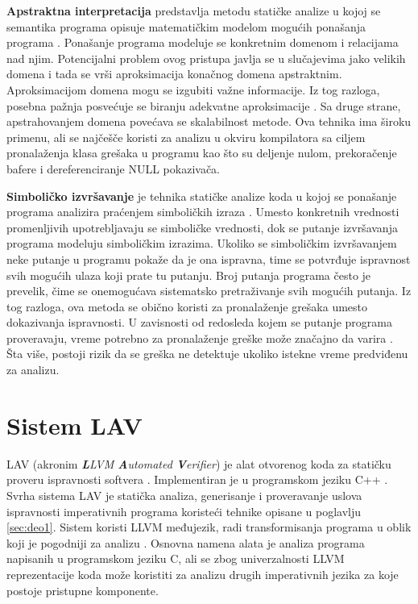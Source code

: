 \documentclass[12pt,oneside]{memoir}
\begin{document}
\par
\textbf{Apstraktna interpretacija} predstavlja metodu statičke analize u kojoj se semantika programa opisuje matematičkim modelom mogućih ponašanja programa \cite{AbstractInterpretation}. Ponašanje programa modeluje se konkretnim domenom i relacijama nad njim. Potencijalni problem ovog pristupa javlja se u slučajevima jako velikih domena i tada se vrši aproksimacija konačnog domena apstraktnim. Aproksimacijom domena mogu se izgubiti važne informacije. Iz tog razloga, posebna pažnja posvećuje se biranju adekvatne aproksimacije \cite{AbstractInterpretation2}. Sa druge strane, apstrahovanjem domena povećava se skalabilnost metode. Ova tehnika ima široku primenu, ali se najčešče koristi za analizu u okviru kompilatora sa ciljem pronalaženja klasa grešaka u programu kao što su deljenje nulom, prekoračenje bafere i dereferenciranje NULL pokazivača.
\par
\textbf{Simboličko izvršavanje} je tehnika statičke analize koda u kojoj se ponašanje programa analizira praćenjem simboličkih izraza \cite{SymbolicExecution}. Umesto konkretnih vrednosti promenljivih upotrebljavaju se simboličke vrednosti, dok se putanje izvršavanja programa modeluju simboličkim izrazima. Ukoliko se simboličkim izvršavanjem neke putanje u programu pokaže da je ona ispravna, time se potvrđuje ispravnost svih mogućih ulaza koji prate tu putanju. Broj putanja programa često je prevelik, čime se onemogućava sistematsko pretraživanje svih mogućih putanja. Iz tog razloga, ova metoda se obično koristi za pronalaženje grešaka umesto dokazivanja ispravnosti. U zavisnosti od redosleda kojem se putanje programa proveravaju, vreme potrebno za pronalaženje greške može značajno da varira \cite{vstteLAV12}. Šta više, postoji rizik da se greška ne detektuje ukoliko istekne vreme predviđenu za analizu.
\section{Sistem LAV}  \label{sec:deo2}
LAV (akronim \textit{\textbf{L}LVM \textbf{A}utomated \textbf{V}erifier}) je alat otvorenog koda za statičku proveru ispravnosti softvera \cite{LAVTool}. Implementiran je u programskom jeziku C++ \cite{LAVCode}. Svrha sistema LAV je statička analiza, generisanje i proveravanje uslova ispravnosti imperativnih programa koristeći tehnike opisane u poglavlju \ref{sec:deo1}. Sistem koristi LLVM međujezik, radi transformisanja programa u oblik koji je pogodniji za analizu \cite{LLVMTool}. Osnovna namena alata je analiza programa napisanih u programskom jeziku C, ali se zbog univerzalnosti LLVM reprezentacije koda može koristiti za analizu drugih imperativnih jezika za koje postoje pristupne komponente. \par
\end{document}
